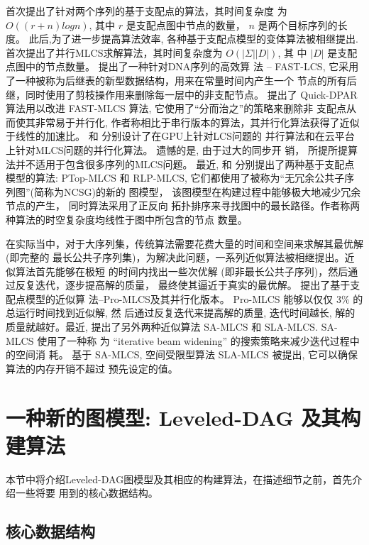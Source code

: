 \documentclass[utf8]{frontiersSCNS} %
\begin{document}
\cite{Hunt1977} 首次提出了针对两个序列的基于支配点的算法，其时间复杂度
为 $O((r+n)logn)$, 其中 $r$ 是支配点图中节点的数量， $n$ 是两个目标序列的长
度。 此后,为了进一步提高算法效率, 各种基于支配点模型的变体算法被相继提出.
\cite{Korkin2001} 首次提出了并行MLCS求解算法，其时间复杂度为 $O(|\Sigma||D|)$, 其
中 $|D|$ 是支配点图中的节点数量。 \cite{Chen2006} 提出了一种针对DNA序列的高效算
法 -- FAST-LCS, 它采用了一种被称为后继表的新型数据结构，用来在常量时间内产生一个
节点的所有后继，同时使用了剪枝操作用来删除每一层中的非支配节点。 \cite{Wang2011}
提出了 Quick-DPAR 算法用以改进 FAST-MLCS 算法, 它使用了“分而治之”的策略来删除非
支配点从而使其非常易于并行化, 作者称相比于串行版本的算法，其并行化算法获得了近似
于线性的加速比。 \cite{Li2012} 和 \cite{Yang2010} 分别设计了在GPU上针对LCS问题的
并行算法和在云平台上针对MLCS问题的并行化算法。 遗憾的是, 由于过大的同步开
销， \cite{Yang2010} 所提所提算法并不适用于包含很多序列的MLCS问题。 最近,
\cite{Li2016_ICDE} 和 \cite{Li2016_SIGKDD} 分别提出了两种基于支配点模型的算法:
PTop-MLCS 和 RLP-MLCS, 它们都使用了被称为“无冗余公共子序列图”(简称为NCSG)的新的
图模型， 该图模型在构建过程中能够极大地减少冗余节点的产生， 同时算法采用了正反向
拓扑排序来寻找图中的最长路径。作者称两种算法的时空复杂度均线性于图中所包含的节点
数量。

在实际当中，对于大序列集，传统算法需要花费大量的时间和空间来求解其最优解(即完整的
最长公共子序列集)，为解决此问题，一系列近似算法被相继提出。近似算法首先能够在极短
的时间内找出一些次优解 (即非最长公共子序列)，然后通过反复迭代，逐步提高解的质量，
最终使其逼近于真实的最优解。\cite{Yang2013} 提出了基于支配点模型的近似算
法--Pro-MLCS及其并行化版本。 Pro-MLCS 能够以仅仅 $3\%$ 的总运行时间找到近似解, 然
后通过反复迭代来提高解的质量, 迭代时间越长, 解的质量就越好。最近,
\cite{Yang2014} 提出了另外两种近似算法 SA-MLCS 和 SLA-MLCS. SA-MLCS 使用了一种称
为 “iterative beam widening” 的搜索策略来减少迭代过程中的空间消
耗。 基于 SA-MLCS, 空间受限型算法 SLA-MLCS 被提出, 它可以确保算法的内存开销不超过
预先设定的值。


\section{一种新的图模型: Leveled-DAG 及其构建算法}
\label{sec:Algorithm}

本节中将介绍Leveled-DAG图模型及其相应的构建算法，在描述细节之前，首先介绍一些将要
用到的核心数据结构。

\subsection{核心数据结构}
\label{sec:data structures}
\end{document}

